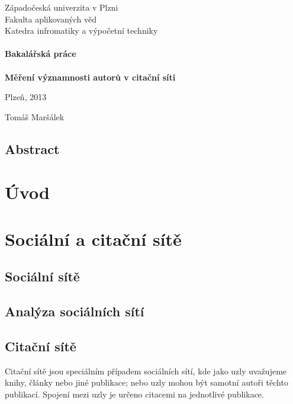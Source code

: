 \documentclass[12pt,titlepage]{report}
\begin{document}
\begin{titlepage}
\begin{center}
	\Large{Západočeská univerzita v Plzni} \\
	\Large{Fakulta aplikovaných věd} \\
	\Large{Katedra infromatiky a výpočetní techniky} \\
\mbox{} \\[1.6cm]
	\LARGE{{\bf Bakalářská práce}} \\
\mbox{} \\
	\Huge{{\bf Měření významnosti autorů v citační síti}} \\
\end{center}
\vfill
\begin{minipage}{.5\textwidth}
Plzeň, 2013
\end{minipage}
\begin{minipage}{.5\textwidth}
\hfill Tomáš Maršálek
\end{minipage}
\thispagestyle{empty}
\end{titlepage}

\section*{Abstract}

\tableofcontents

\chapter{Úvod}

\chapter{Sociální a citační sítě}
\section{Sociální sítě}

\section{Analýza sociálních sítí}

\section{Citační sítě}
Citační sítě jsou speciálním případem sociálních sítí, kde jako uzly uvažujeme
knihy, články nebo jiné publikace; nebo uzly mohou být samotní autoři těchto
publikací. Spojení mezi uzly je určeno citacemi na jednotlivé publikace. 
\end{document}
